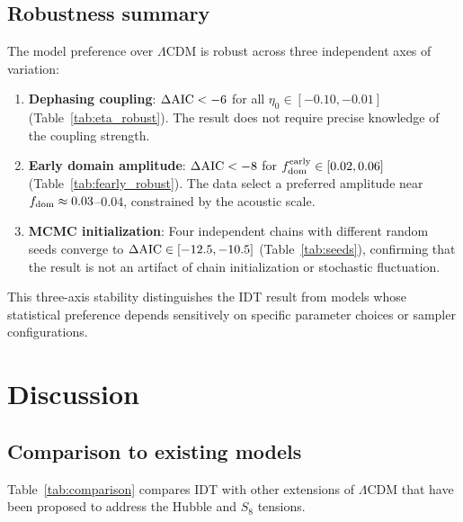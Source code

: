 \documentclass[aps,prd,twocolumn,superscriptaddress,nofootinbib]{revtex4-2}
\newcommand{\fdom}{f_{\rm dom}}
\newcommand{\dAIC}{\Delta{\rm AIC}}
\begin{document}
\subsection{Robustness summary}

The model preference over $\Lambda$CDM is robust across three
independent axes of variation:

\begin{enumerate}
\item \textbf{Dephasing coupling}: $\dAIC < -6$ for all
$\eta_0 \in [-0.10, -0.01]$ (Table~\ref{tab:eta_robust}). The
result does not require precise knowledge of the coupling strength.

\item \textbf{Early domain amplitude}: $\dAIC < -8$ for
$\fdom^{\rm early} \in [0.02, 0.06]$ (Table~\ref{tab:fearly_robust}).
The data select a preferred amplitude near $\fdom \approx
0.03$--$0.04$, constrained by the acoustic scale.

\item \textbf{MCMC initialization}: Four independent chains with
different random seeds converge to $\dAIC \in [-12.5, -10.5]$
(Table~\ref{tab:seeds}), confirming that the result is not an
artifact of chain initialization or stochastic fluctuation.
\end{enumerate}

This three-axis stability distinguishes the IDT result from models
whose statistical preference depends sensitively on specific
parameter choices or sampler configurations.

\section{Discussion}
\label{sec:discussion}

\subsection{Comparison to existing models}

Table~\ref{tab:comparison} compares IDT with other extensions of
$\Lambda$CDM that have been proposed to address the Hubble and
$S_8$ tensions.
\end{document}
